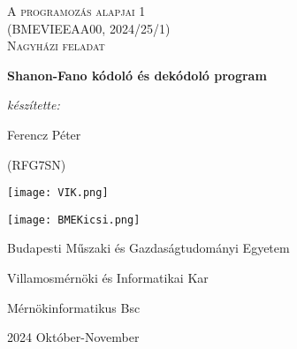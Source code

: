 \begin{titlepage}
    \centering
    \vspace{1cm}
    {\Large \textsc{A programozás alapjai 1\\(BMEVIEEAA00, 2024/25/1)\\  Nagyházi feladat}\par}
    \vspace{1.5cm}  
    {\huge\bfseries Shanon-Fano kódoló és dekódoló program\par}
    \vspace{2cm}
    {\Large\itshape készítette: \par Ferencz Péter\par (RFG7SN)}
    \vfill
    \texttt{[image: VIK.png]}\par
    \texttt{[image: BMEKicsi.png]}\par
    Budapesti Műszaki és Gazdaságtudományi Egyetem\par
    Villamosmérnöki és Informatikai Kar\par
    Mérnökinformatikus Bsc\par
    {\large 2024 Október-November\par}
\end{titlepage}